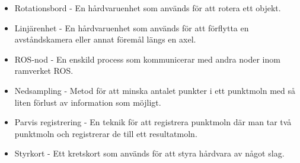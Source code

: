 \begin{itemize}
	\item Rotationsbord - En hårdvaruenhet som används för att rotera ett objekt.
	\item Linjärenhet - En hårdvaruenhet som används för att förflytta en avståndskamera eller annat föremål längs en axel.
	\item ROS-nod - En enskild process som kommunicerar med andra noder inom ramverket ROS.
	\item Nedsampling - Metod för att minska antalet punkter i ett punktmoln med så liten förlust av information som möjligt.
	\item Parvis registrering - En teknik för att registrera punktmoln där man tar två punktmoln och registrerar de till ett resultatmoln.
	\item Styrkort - Ett kretskort som används för att styra hårdvara av något slag.
\end{itemize} 



